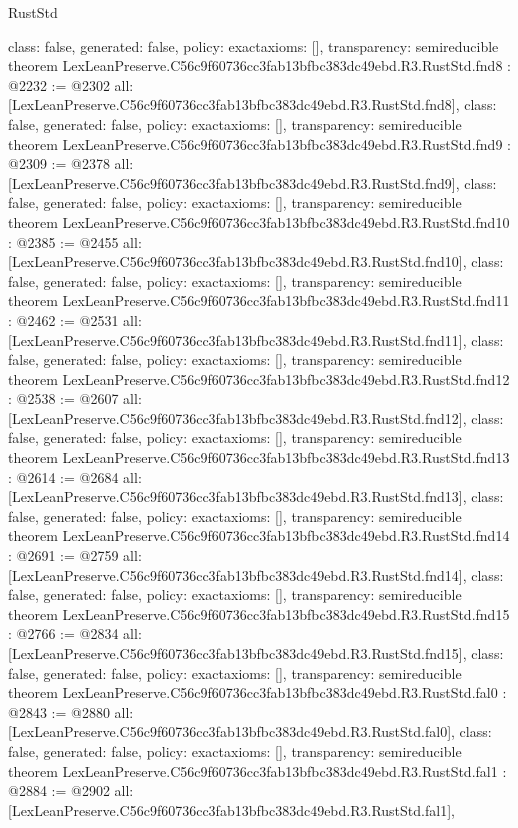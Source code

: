 \begin{lexlean}{RustStd}
\begin{coremodule}
{  class: false,
  generated: false,
  policy: exact{axioms: []},
  transparency: semireducible
}
theorem LexLeanPreserve.C56c9f60736cc3fab13bfbc383dc49ebd.R3.RustStd.fnd8 : @2232 := @2302 {
  all: [LexLeanPreserve.C56c9f60736cc3fab13bfbc383dc49ebd.R3.RustStd.fnd8],
  class: false,
  generated: false,
  policy: exact{axioms: []},
  transparency: semireducible
}
theorem LexLeanPreserve.C56c9f60736cc3fab13bfbc383dc49ebd.R3.RustStd.fnd9 : @2309 := @2378 {
  all: [LexLeanPreserve.C56c9f60736cc3fab13bfbc383dc49ebd.R3.RustStd.fnd9],
  class: false,
  generated: false,
  policy: exact{axioms: []},
  transparency: semireducible
}
theorem LexLeanPreserve.C56c9f60736cc3fab13bfbc383dc49ebd.R3.RustStd.fnd10 : @2385 := @2455 {
  all: [LexLeanPreserve.C56c9f60736cc3fab13bfbc383dc49ebd.R3.RustStd.fnd10],
  class: false,
  generated: false,
  policy: exact{axioms: []},
  transparency: semireducible
}
theorem LexLeanPreserve.C56c9f60736cc3fab13bfbc383dc49ebd.R3.RustStd.fnd11 : @2462 := @2531 {
  all: [LexLeanPreserve.C56c9f60736cc3fab13bfbc383dc49ebd.R3.RustStd.fnd11],
  class: false,
  generated: false,
  policy: exact{axioms: []},
  transparency: semireducible
}
theorem LexLeanPreserve.C56c9f60736cc3fab13bfbc383dc49ebd.R3.RustStd.fnd12 : @2538 := @2607 {
  all: [LexLeanPreserve.C56c9f60736cc3fab13bfbc383dc49ebd.R3.RustStd.fnd12],
  class: false,
  generated: false,
  policy: exact{axioms: []},
  transparency: semireducible
}
theorem LexLeanPreserve.C56c9f60736cc3fab13bfbc383dc49ebd.R3.RustStd.fnd13 : @2614 := @2684 {
  all: [LexLeanPreserve.C56c9f60736cc3fab13bfbc383dc49ebd.R3.RustStd.fnd13],
  class: false,
  generated: false,
  policy: exact{axioms: []},
  transparency: semireducible
}
theorem LexLeanPreserve.C56c9f60736cc3fab13bfbc383dc49ebd.R3.RustStd.fnd14 : @2691 := @2759 {
  all: [LexLeanPreserve.C56c9f60736cc3fab13bfbc383dc49ebd.R3.RustStd.fnd14],
  class: false,
  generated: false,
  policy: exact{axioms: []},
  transparency: semireducible
}
theorem LexLeanPreserve.C56c9f60736cc3fab13bfbc383dc49ebd.R3.RustStd.fnd15 : @2766 := @2834 {
  all: [LexLeanPreserve.C56c9f60736cc3fab13bfbc383dc49ebd.R3.RustStd.fnd15],
  class: false,
  generated: false,
  policy: exact{axioms: []},
  transparency: semireducible
}
theorem LexLeanPreserve.C56c9f60736cc3fab13bfbc383dc49ebd.R3.RustStd.fal0 : @2843 := @2880 {
  all: [LexLeanPreserve.C56c9f60736cc3fab13bfbc383dc49ebd.R3.RustStd.fal0],
  class: false,
  generated: false,
  policy: exact{axioms: []},
  transparency: semireducible
}
theorem LexLeanPreserve.C56c9f60736cc3fab13bfbc383dc49ebd.R3.RustStd.fal1 : @2884 := @2902 {
  all: [LexLeanPreserve.C56c9f60736cc3fab13bfbc383dc49ebd.R3.RustStd.fal1],
}
\end{coremodule}
\end{lexlean}
